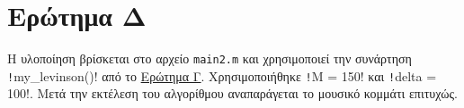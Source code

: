 \section{Ερώτημα Δ}\label{section:D}
Η υλοποίηση βρίσκεται στο αρχείο \texttt{main2.m} και χρησιμοποιεί την συνάρτηση \texttt!my_levinson()! από το
\hyperref[section:C]{Ερώτημα Γ}.
Χρησιμοποιήθηκε \texttt!M = 150! και \texttt!delta = 100!.
Μετά την εκτέλεση του αλγορίθμου αναπαράγεται το μουσικό κομμάτι επιτυχώς.
